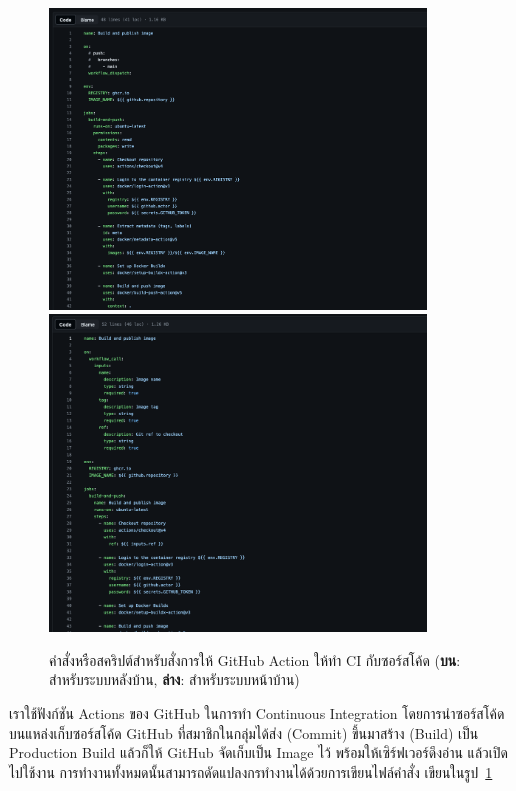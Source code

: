 \documentclass[12pt,one side,openright,a4paper]{cpe-thesis-th}
\newcommand{\thaijustify}[1]{%
  \par\hspace{30pt}\justifying
  #1
}
\begin{document}
            \begin{figure}[H]
                \centering
                \includegraphics[width=10cm]{figure/results/gh-action-back.png}
                \includegraphics[width=10cm]{figure/results/gh-action-front.png}
                \caption[คำสั่งการทำ CI บน GitHub Action]{คำสั่งหรือสคริปต์สำหรับสั่งการให้ GitHub Action ให้ทำ CI กับซอร์สโค้ด (\textbf{บน}: สำหรับระบบหลังบ้าน, \textbf{ล่าง}: สำหรับระบบหน้าบ้าน)}
                \label{fig:res-gh-action-script}
            \end{figure}
            \thaijustify{
                เราใช้ฟังก์ชัน Actions ของ GitHub ในการทำ Continuous Integration โดยการนำซอร์สโค้ดบนแหล่งเก็บซอร์สโค้ด GitHub ที่สมาชิกในกลุ่มได้ส่ง (Commit) ขึ้นมาสร้าง (Build) เป็น Production Build แล้วก็ให้ GitHub จัดเก็บเป็น Image ไว้ พร้อมให้เซิร์ฟเวอร์ดึงอ่าน แล้วเปิดไปใช้งาน การทำงานทั้งหมดนั้นสามารถดัดแปลงกรทำงานได้ด้วยการเขียนไฟล์คำสั่ง เขียนในรูป~\ref{fig:res-gh-action-script}
            }
\end{document}
